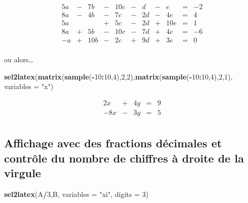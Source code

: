 \documentclass[]{article}
\newenvironment{Shaded}{\begin{snugshade}}{\end{snugshade}}
\newcommand{\DataTypeTok}[1]{\textcolor[rgb]{0.13,0.29,0.53}{#1}}
\newcommand{\DecValTok}[1]{\textcolor[rgb]{0.00,0.00,0.81}{#1}}
\newcommand{\KeywordTok}[1]{\textcolor[rgb]{0.13,0.29,0.53}{\textbf{#1}}}
\newcommand{\NormalTok}[1]{#1}
\newcommand{\OperatorTok}[1]{\textcolor[rgb]{0.81,0.36,0.00}{\textbf{#1}}}
\newcommand{\StringTok}[1]{\textcolor[rgb]{0.31,0.60,0.02}{#1}}
\begin{document}
\[
\begin{array}{rrrrrrrrrrr}
5 a & - & 7 b & - & 10 c & - & d & - & e & = & -2 \\ 
8 a & - & 4 b & - & 7 c & - & 2 d & - & 4 e & = & 4 \\ 
5 a & & & + & 5 c & - & 2 d & + & 10 e & = & 1 \\ 
8 a & + & 5 b & - & 10 c & - & 7 d & + & 4 e & = & -6 \\ 
-a & + & 10 b & - & 2 c & + & 9 d & + & 3 e & = & 0 \\ 
\end{array}
\]

ou alors\ldots{}

\begin{Shaded}
\begin{Highlighting}[]
\KeywordTok{sel2latex}\NormalTok{(}\KeywordTok{matrix}\NormalTok{(}\KeywordTok{sample}\NormalTok{(}\OperatorTok{-}\DecValTok{10}\OperatorTok{:}\DecValTok{10}\NormalTok{,}\DecValTok{4}\NormalTok{),}\DecValTok{2}\NormalTok{,}\DecValTok{2}\NormalTok{),}\KeywordTok{matrix}\NormalTok{(}\KeywordTok{sample}\NormalTok{(}\OperatorTok{-}\DecValTok{10}\OperatorTok{:}\DecValTok{10}\NormalTok{,}\DecValTok{4}\NormalTok{),}\DecValTok{2}\NormalTok{,}\DecValTok{1}\NormalTok{), }\DataTypeTok{variables =} \StringTok{"x"}\NormalTok{)}
\end{Highlighting}
\end{Shaded}

\[
\begin{array}{rrrrr}
2 x & + & 4 y & = & 9 \\ 
-8 x & - & 3 y & = & 5 \\ 
\end{array}
\]

\hypertarget{affichage-avec-des-fractions-decimales-et-controle-du-nombre-de-chiffres-a-droite-de-la-virgule}{%
\subsection{Affichage avec des fractions décimales et contrôle du nombre
de chiffres à droite de la
virgule}\label{affichage-avec-des-fractions-decimales-et-controle-du-nombre-de-chiffres-a-droite-de-la-virgule}}

\begin{Shaded}
\begin{Highlighting}[]
\KeywordTok{sel2latex}\NormalTok{(A}\OperatorTok{/}\DecValTok{3}\NormalTok{,B, }\DataTypeTok{variables =} \StringTok{"xi"}\NormalTok{, }\DataTypeTok{digits =} \DecValTok{3}\NormalTok{)}
\end{Highlighting}
\end{Shaded}
\end{document}
